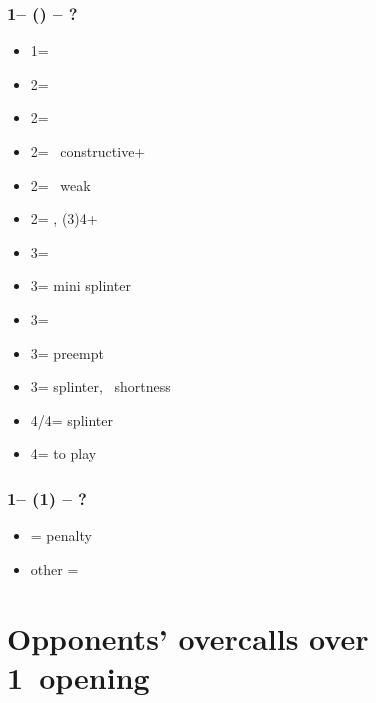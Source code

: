 \documentclass[12pt, a4paper]{report}
\begin{document}
{{{            \subsubsection*{1\spades -- (\dbl) -- ?}
            \begin{itemize}
                \item 1\nt = \trsf{\clubs}
                \item 2\clubs = \trsf{\diams}
                \item 2\diams = \trsf{\hearts}
                \item 2\hearts = \spades\ constructive+
                \item 2\spades = \spades\ weak
                \item 2\nt = \invp, (3)4+\spades
                \item 3\clubs = \mixed
                \item 3\diams = mini splinter \gf
                \item 3\hearts = \hearts\ \inv
                \item 3\spades = preempt
                \item 3\nt = splinter, \hearts\ shortness
                \item 4\clubs/4\diams = splinter
                \item 4\hearts = to play
            \end{itemize}

            \subsubsection*{1\spades -- (1\nt) -- ?}
            \begin{itemize}
                \item \dbl = penalty
                \item other = \nat
            \end{itemize}

        }

        \section*{\colorbox{blue!30}{Opponents' overcalls over 1\ntx\ opening}}
         {

}}}
\end{document}
